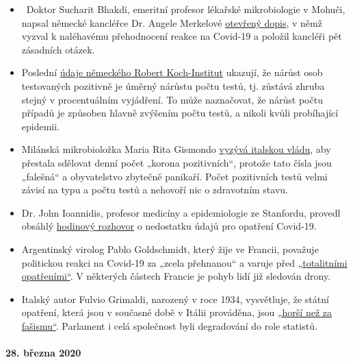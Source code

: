 \begin{itemize}
\tightlist
\item
  ~Doktor Sucharit Bhakdi, emeritní profesor lékařské mikrobiologie v
  Mohuči, napsal německé kancléřce Dr. Angele Merkelové
  \href{https://swprs.org/open-letter-from-professor-sucharit-bhakdi-to-german-chancellor-dr-angela-merkel/}{otevřený
  dopis}, v němž vyzval k naléhavému přehodnocení reakce na Covid-19 a
  položil kancléři pět zásadních otázek.
\item
  Poslední
  \href{https://multipolar-magazin.de/artikel/coronavirus-irrefuhrung-fallzahlen}{údaje
  německého Robert Koch-Institut} ukazují, že nárůst osob testovaných
  pozitivně je úměrný nárůstu počtu testů, tj. zůstává zhruba stejný v
  procentuálním vyjádření. To může naznačovat, že nárůst počtu případů
  je způsoben hlavně zvýšením počtu testů, a nikoli kvůli probíhající
  epidemii.
\item
  Milánská mikrobioložka Maria Rita Gismondo
  \href{https://www.secoloditalia.it/2020/03/coronavirus-la-gismondo-ammonisce-duramente-basta-snocciolare-numeri-sui-positivi-sono-dati-falsati/}{vyzývá
  italskou vládu}, aby přestala sdělovat denní počet „korona
  pozitivních``, protože tato čísla jsou „falešná`` a obyvatelstvo
  zbytečně panikaří. Počet pozitivních testů velmi závisí na typu a
  počtu testů a nehovoří nic o zdravotním stavu.
\item
  Dr. John Ioannidis, profesor medicíny a epidemiologie ze Stanfordu,
  provedl obsáhlý
  \href{https://www.youtube.com/watch?v=d6MZy-2fcBw}{hodinový rozhovor}
  o nedostatku údajů pro opatření Covid-19.
\item
  Argentinský virolog Pablo Goldschmidt, který žije ve Francii, považuje
  politickou reakci na Covid-19 za „zcela přehnanou`` a varuje před
  \href{https://www.infobae.com/coronavirus/2020/03/28/para-un-prestigioso-cientifico-argentino-el-coronavirus-no-merece-que-el-planeta-este-en-un-estado-de-parate-total/}{„totalitními
  opatřeními``}. V některých částech Francie je pohyb lidí již sledován
  drony.
\item
  Italský autor Fulvio Grimaldi, narozený v roce 1934, vysvětluje, že
  státní opatření, která jsou v současné době v Itálii prováděna, jsou
  \href{https://www.youtube.com/watch?v=O3BuNp01vpc}{„horší než za
  fašismu``}. Parlament i celá společnost byli degradování do role
  statistů.\\
\end{itemize}

\hypertarget{28-bux159ezna-2020}{%
\paragraph{28. března 2020}\label{28-bux159ezna-2020}}

